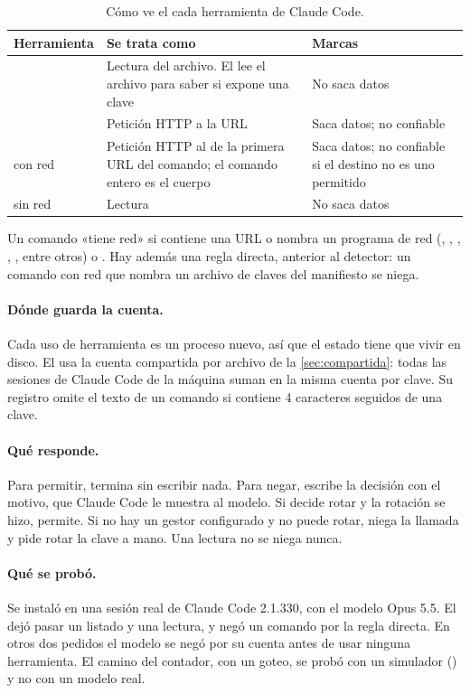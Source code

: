 \begin{table}[ht]
\caption{Cómo ve el  cada herramienta de Claude Code.}\label{tab:hook}
\small
\begin{tabularx}{\textwidth}{@{}P{3.1cm}LL@{}}
\toprule
Herramienta & Se trata como & Marcas \\
\midrule
{} & Lectura del archivo. El  lee el archivo para saber si expone una clave & No
  saca datos \\
 & Petición HTTP a la URL & Saca datos; no confiable \\
 con red & Petición HTTP al  de la primera URL del comando; el comando entero es
  el cuerpo & Saca datos; no confiable si el destino no es uno permitido \\
 sin red & Lectura & No saca datos \\
\bottomrule
\end{tabularx}
\end{table}

Un comando «tiene red» si contiene una URL o nombra un programa de red (, ,
, , , entre otros) o . Hay además una regla directa, anterior
al detector: un comando con red que nombra un archivo de claves del manifiesto se niega.

\paragraph{Dónde guarda la cuenta.} Cada uso de herramienta es un proceso nuevo, así que el estado
tiene que vivir en disco. El  usa la cuenta compartida por archivo de la
\cref{sec:compartida}: todas las sesiones de Claude Code de la máquina suman en la misma cuenta por
clave. Su registro omite el texto de un comando si contiene 4 caracteres seguidos de una clave.

\paragraph{Qué responde.} Para permitir, termina sin escribir nada. Para negar, escribe la decisión
 con el motivo, que Claude Code le muestra al modelo. Si decide rotar y la rotación se hizo,
permite. Si no hay un gestor configurado y no puede rotar, niega la llamada y pide rotar la clave a
mano. Una lectura no se niega nunca.

\paragraph{Qué se probó.} Se instaló en una sesión real de Claude Code 2.1.330, con el modelo Opus
5.5. El  dejó pasar un listado y una lectura, y negó un comando por la regla directa. En
otros dos pedidos el modelo se negó por su cuenta antes de usar ninguna herramienta. El camino del
contador, con un goteo, se probó con un simulador () y no con un modelo real.

